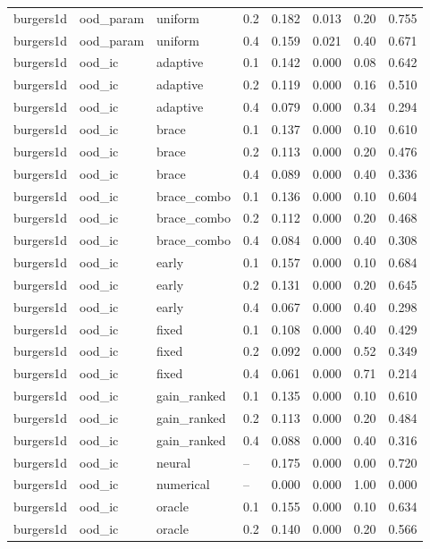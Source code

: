 \begin{tabular}{llllrrrr}
burgers1d & ood\_param & uniform & 0.2 & 0.182 & 0.013 & 0.20 & 0.755 \\
burgers1d & ood\_param & uniform & 0.4 & 0.159 & 0.021 & 0.40 & 0.671 \\
\midrule
burgers1d & ood\_ic & adaptive & 0.1 & 0.142 & 0.000 & 0.08 & 0.642 \\
burgers1d & ood\_ic & adaptive & 0.2 & 0.119 & 0.000 & 0.16 & 0.510 \\
burgers1d & ood\_ic & adaptive & 0.4 & 0.079 & 0.000 & 0.34 & 0.294 \\
burgers1d & ood\_ic & brace & 0.1 & 0.137 & 0.000 & 0.10 & 0.610 \\
burgers1d & ood\_ic & brace & 0.2 & 0.113 & 0.000 & 0.20 & 0.476 \\
burgers1d & ood\_ic & brace & 0.4 & 0.089 & 0.000 & 0.40 & 0.336 \\
burgers1d & ood\_ic & brace\_combo & 0.1 & 0.136 & 0.000 & 0.10 & 0.604 \\
burgers1d & ood\_ic & brace\_combo & 0.2 & 0.112 & 0.000 & 0.20 & 0.468 \\
burgers1d & ood\_ic & brace\_combo & 0.4 & 0.084 & 0.000 & 0.40 & 0.308 \\
burgers1d & ood\_ic & early & 0.1 & 0.157 & 0.000 & 0.10 & 0.684 \\
burgers1d & ood\_ic & early & 0.2 & 0.131 & 0.000 & 0.20 & 0.645 \\
burgers1d & ood\_ic & early & 0.4 & 0.067 & 0.000 & 0.40 & 0.298 \\
burgers1d & ood\_ic & fixed & 0.1 & 0.108 & 0.000 & 0.40 & 0.429 \\
burgers1d & ood\_ic & fixed & 0.2 & 0.092 & 0.000 & 0.52 & 0.349 \\
burgers1d & ood\_ic & fixed & 0.4 & 0.061 & 0.000 & 0.71 & 0.214 \\
burgers1d & ood\_ic & gain\_ranked & 0.1 & 0.135 & 0.000 & 0.10 & 0.610 \\
burgers1d & ood\_ic & gain\_ranked & 0.2 & 0.113 & 0.000 & 0.20 & 0.484 \\
burgers1d & ood\_ic & gain\_ranked & 0.4 & 0.088 & 0.000 & 0.40 & 0.316 \\
burgers1d & ood\_ic & neural & -- & 0.175 & 0.000 & 0.00 & 0.720 \\
burgers1d & ood\_ic & numerical & -- & 0.000 & 0.000 & 1.00 & 0.000 \\
burgers1d & ood\_ic & oracle & 0.1 & 0.155 & 0.000 & 0.10 & 0.634 \\
burgers1d & ood\_ic & oracle & 0.2 & 0.140 & 0.000 & 0.20 & 0.566 \\

\end{tabular}
